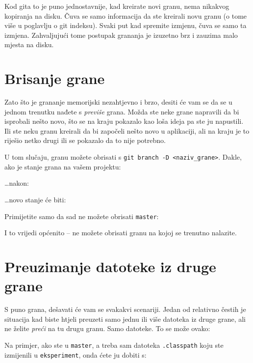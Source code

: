 Kod gita to je puno jednostavnije, kad kreirate novi granu, nema nikakvog kopiranja na disku. 
Čuva se samo informacija da ste kreirali novu granu (o tome više u poglavlju o git indeksu).
Svaki put kad spremite izmjenu, čuva se samo ta izmjena.
Zahvaljujući tome postupak grananja je izuzetno brz i zauzima malo mjesta na disku.

\section*{Brisanje grane}

Zato što je grananje memorijski nezahtjevno i brzo, desiti će vam se da se u jednom trenutku nađete s \emph{previše} grana.
Možda ste neke grane napravili da bi isprobali nešto novo, što se na kraju pokazalo kao loša ideja pa ste ju napustili.
Ili ste neku granu kreirali da bi započeli nešto novo u aplikaciji, ali na kraju je to riješio netko drugi ili se pokazalo da to nije potrebno.

U tom slučaju, granu možete obrisati s \verb+git branch -D <naziv_grane>+. 
Dakle, ako je stanje grana na vašem projektu:



\dots{}nakon:



\dots{}novo stanje će biti:



Primijetite samo da sad ne možete obrisati \verb+master+:



I to vrijedi općenito -- ne možete obrisati granu na kojoj se trenutno nalazite.

\section*{Preuzimanje datoteke iz druge grane}

S puno grana, dešavati će vam se svakakvi scenariji.
Jedan od relativno čestih je situacija kad biste htjeli preuzeti samo jednu ili više datoteka iz druge grane, ali ne želite \emph{preći} na tu drugu granu.
Samo datoteke.
To se može ovako:


Na primjer, ako ste u \verb+master+, a treba sam datoteka \verb+.classpath+ koju ste izmijenili u \verb+eksperiment+, onda ćete ju dobiti s:

